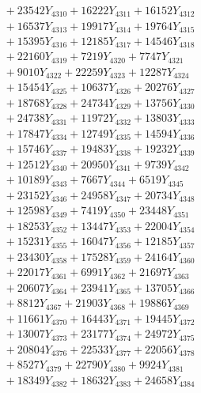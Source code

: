 \documentclass[a4paper,10pt]{article}
\begin{document}
{\begin{align}
&\;  + 23542 Y_{4310} + 16222 Y_{4311} + 16152 Y_{4312} \\[0.3ex]
&\;  + 16537 Y_{4313} + 19917 Y_{4314} + 19764 Y_{4315} \\[0.3ex]
&\;  + 15395 Y_{4316} + 12185 Y_{4317} + 14546 Y_{4318} \\[0.5ex]\allowbreak
&\;  + 22160 Y_{4319} + 7219 Y_{4320} + 7747 Y_{4321} \\[0.3ex]
&\;  + 9010 Y_{4322} + 22259 Y_{4323} + 12287 Y_{4324} \\[0.3ex]
&\;  + 15454 Y_{4325} + 10637 Y_{4326} + 20276 Y_{4327} \\[0.3ex]
&\;  + 18768 Y_{4328} + 24734 Y_{4329} + 13756 Y_{4330} \\[0.3ex]
&\;  + 24738 Y_{4331} + 11972 Y_{4332} + 13803 Y_{4333} \\[0.3ex]
&\;  + 17847 Y_{4334} + 12749 Y_{4335} + 14594 Y_{4336} \\[0.3ex]
&\;  + 15746 Y_{4337} + 19483 Y_{4338} + 19232 Y_{4339} \\[0.3ex]
&\;  + 12512 Y_{4340} + 20950 Y_{4341} + 9739 Y_{4342} \\[0.3ex]
&\;  + 10189 Y_{4343} + 7667 Y_{4344} + 6519 Y_{4345} \\[0.3ex]
&\;  + 23152 Y_{4346} + 24958 Y_{4347} + 20734 Y_{4348} \\[0.5ex]\allowbreak
&\;  + 12598 Y_{4349} + 7419 Y_{4350} + 23448 Y_{4351} \\[0.3ex]
&\;  + 18253 Y_{4352} + 13447 Y_{4353} + 22004 Y_{4354} \\[0.3ex]
&\;  + 15231 Y_{4355} + 16047 Y_{4356} + 12185 Y_{4357} \\[0.3ex]
&\;  + 23430 Y_{4358} + 17528 Y_{4359} + 24164 Y_{4360} \\[0.3ex]
&\;  + 22017 Y_{4361} + 6991 Y_{4362} + 21697 Y_{4363} \\[0.3ex]
&\;  + 20607 Y_{4364} + 23941 Y_{4365} + 13705 Y_{4366} \\[0.3ex]
&\;  + 8812 Y_{4367} + 21903 Y_{4368} + 19886 Y_{4369} \\[0.3ex]
&\;  + 11661 Y_{4370} + 16443 Y_{4371} + 19445 Y_{4372} \\[0.3ex]
&\;  + 13007 Y_{4373} + 23177 Y_{4374} + 24972 Y_{4375} \\[0.3ex]
&\;  + 20804 Y_{4376} + 22533 Y_{4377} + 22056 Y_{4378} \\[0.5ex]\allowbreak
&\;  + 8527 Y_{4379} + 22790 Y_{4380} + 9924 Y_{4381} \\[0.3ex]
&\;  + 18349 Y_{4382} + 18632 Y_{4383} + 24658 Y_{4384} \\[0.3ex]

\end{align}}
\end{document}
